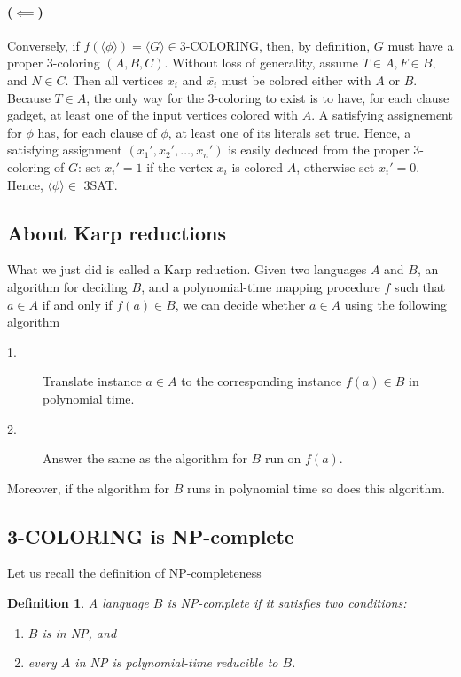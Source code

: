 \documentclass{article}
\makeatletter
\newcommand{\definitionname}{Definition}
\newtheorem{definition}{\definitionname}
\newenvironment{steps}%
{%
\vspace{0.25cm}%
\begin{adjustwidth}{0.3cm}{0cm}%
\begin{description}%
}
{%
\end{description}%
\end{adjustwidth}%
\vspace{0.1cm}%
}
\newcounter{TMachine}[section]
\newenvironment{TMachine}[1]
  {\refstepcounter{TMachine}%
   \par%
   \vspace{.5\baselineskip\@plus.2\baselineskip\@minus.2\baselineskip}%
   \noindent{#1}%
   \begin{steps}}%
  {\end{steps}%
\vspace{.5\baselineskip\@plus.2\baselineskip\@minus.2\baselineskip}%
}%
\makeatother
\begin{document}
\paragraph{($\impliedby$)} Conversely, if $f(\langle \phi \rangle) = \langle G
\rangle \in \text{3-COLORING}$,
then, by definition, $G$ must have a proper 3-coloring $(A,B,C)$. Without loss
of generality, assume $T\in A, F\in B$, and $N\in C$. Then all vertices $x_i$
and $\bar{x_i}$ must be colored either with $A$ or $B$. Because $T\in A$,
the only way for the 3-coloring to exist is to have, for each clause gadget,
at least one of the input vertices colored with $A$. A satisfying assignement
for $\phi$ has, for each clause of $\phi$, at least one of its literals set
true. Hence, a satisfying assignment $(x_1', x_2', \ldots, x_n')$ is easily
deduced from the proper 3-coloring of $G$: set $x_i'=1$ if the vertex $x_i$ is
colored $A$, otherwise set $x_i'=0$. Hence, $\langle \phi \rangle \in$ 3SAT.

\subsection{About Karp reductions}

What we just did is called a Karp reduction. Given two languages $A$
and $B$, an algorithm for deciding $B$, and a polynomial-time
mapping procedure $f$ such that
$a \in A$ if and only if $f(a) \in B$, we can decide whether $a \in A$ using
the following algorithm
\begin{TMachine}{On input $a$:}
\item[1.] Translate instance $a \in A$ to the corresponding instance $f(a) \in
	B$ in polynomial time.
\item[2.] Answer the same as the algorithm for $B$ run on $f(a)$.
\end{TMachine}
Moreover, if the algorithm for $B$ runs in polynomial time so does this
algorithm.

\subsection{3-COLORING is NP-complete}

Let us recall the definition of NP-completeness
\begin{definition}
	A language $B$ is NP-complete if it satisfies two conditions:
	\begin{enumerate}
		\item $B$ is in NP, and
		\item every $A$ in NP is polynomial-time reducible to $B$.
	\end{enumerate}
\end{definition}
\end{document}
